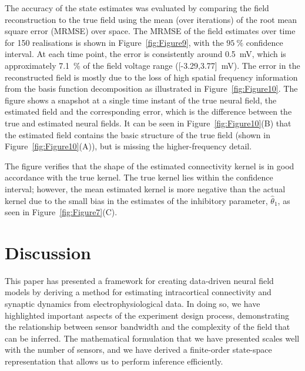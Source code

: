 \documentclass[12pt]{iopart}
\begin{document}
The accuracy of the state estimates was evaluated by comparing the field reconstruction to the true field using the mean (over iterations) of the root mean square error (MRMSE) over space. The MRMSE of the field estimates over time for 150 realisations is shown in Figure~\ref{fig:Figure9}, with the $95~\%$ confidence interval. At each time point, the error is consistently around 0.5~mV, which is approximately 7.1~\% of the field voltage range ([-3.29,3.77]~mV). The error in the reconstructed field is mostly due to the loss of high spatial frequency information from the basis function decomposition as illustrated in Figure~\ref{fig:Figure10}. The figure shows a snapshot at a single time instant of the true neural field, the estimated field and the corresponding error, which is the difference between the true and estimated neural fields. It can be seen in Figure~\ref{fig:Figure10}(B) that the estimated field contains the basic structure of the true field (shown in Figure~\ref{fig:Figure10}(A)), but is missing the higher-frequency detail.

  The figure verifies that the shape of the estimated connectivity kernel is in good accordance with the true kernel. The true kernel lies within the confidence interval; however, the mean estimated kernel is more negative than the actual kernel due to the small bias in the estimates of the inhibitory parameter, $\hat\theta_1$, as seen in Figure~\ref{fig:Figure7}(C).





\section{Discussion}\label{DiscussionSection}
This paper has presented a framework for creating data-driven neural field models by deriving a method for estimating intracortical connectivity and synaptic dynamics from electrophysiological data. In doing so, we have highlighted important aspects of the experiment design process, demonstrating the relationship between sensor bandwidth and the complexity of the field that can be inferred. The mathematical formulation that we have presented scales well with the number of sensors, and we have derived a finite-order state-space representation that allows us to perform inference efficiently. 
\end{document}
